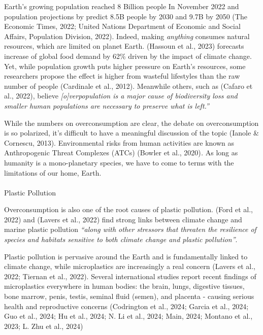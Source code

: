 \documentclass[
  letterpaper,
  DIV=11,
  numbers=noendperiod]{scrartcl}
\makeatletter
\let\oldparagraph\paragraph
\renewcommand{\paragraph}{
    \@ifstar
      \xxxParagraphStar
      \xxxParagraphNoStar
  }
\newcommand{\xxxParagraphStar}[1]{\oldparagraph*{#1}\mbox{}}
\newcommand{\xxxParagraphNoStar}[1]{\oldparagraph{#1}\mbox{}}
\makeatother
\begin{document}
Earth's growing population reached 8 Billion people In November 2022 and
population projections by predict 8.5B people by 2030 and 9.7B by 2050
(The Economic Times, 2022; United Nations Department of Economic and
Social Affairs, Population Division, 2022). Indeed, making
\emph{anything} consumes natural resources, which are limited on planet
Earth. (Hassoun et al., 2023) forecasts increase of global food demand
by 62\% driven by the impact of climate change. Yet, while population
growth puts higher pressure on Earth's resources, some researchers
propose the effect is higher from wasteful lifestyles than the raw
number of people (Cardinale et al., 2012). Meanwhile others, such as
(Cafaro et al., 2022), believe \emph{{[}o{]}verpopulation is a major
cause of biodiversity loss and smaller human populations are necessary
to preserve what is left.''}

While the numbers on overconsumption are clear, the debate on
overconsumption is so polarized, it's difficult to have a meaningful
discussion of the topic (Ianole \& Cornescu, 2013). Environmental risks
from human activities are known as Anthropogenic Threat Complexes (ATCs)
(Bowler et al., 2020)\emph{.} As long as humanity is a mono-planetary
species, we have to come to terms with the limitations of our home,
Earth.

\paragraph{Plastic Pollution}\label{plastic-pollution}

Overconsumption is also one of the root causes of plastic pollution.
(Ford et al., 2022) and (Lavers et al., 2022) find strong links between
climate change and marine plastic pollution \emph{``along with other
stressors that threaten the resilience of species and habitats sensitive
to both climate change and plastic pollution''}.

Plastic pollution is pervasive around the Earth and is fundamentally
linked to climate change, while microplastics are increasingly a real
concern (Lavers et al., 2022; Tiernan et al., 2022). Several
international studies report recent findings of microplastics everywhere
in human bodies: the brain, lungs, digestive tissues, bone marrow,
penis, testis, seminal fluid (semen), and placenta - causing serious
health and reproductive concerns (Codrington et al., 2024; Garcia et
al., 2024; Guo et al., 2024; Hu et al., 2024; N. Li et al., 2024; Main,
2024; Montano et al., 2023; L. Zhu et al., 2024)
\end{document}
